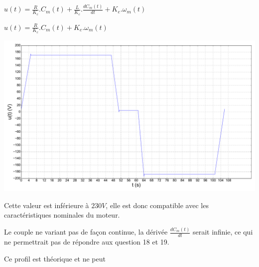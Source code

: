 
$u(t)=\frac{R}{K_c}.C_m(t)+\frac{L}{K_c}.\frac{dC_m(t)}{dt}+K_e.\omega_m(t)$


$u(t)=\frac{R}{K_c}.C_m(t)+K_e.\omega_m(t)$


\begin{center}
 \includegraphics[width=0.9\linewidth]{img/tension_cor}
\end{center}


Cette valeur est inférieure à $230V$, elle est donc compatible avec les caractéristiques nominales du moteur.


Le couple ne variant pas de façon continue, la dérivée $\frac{dC_m(t)}{dt}$ serait infinie, ce qui ne permettrait pas de répondre aux question 18 et 19.


Ce profil est théorique et ne peut 

